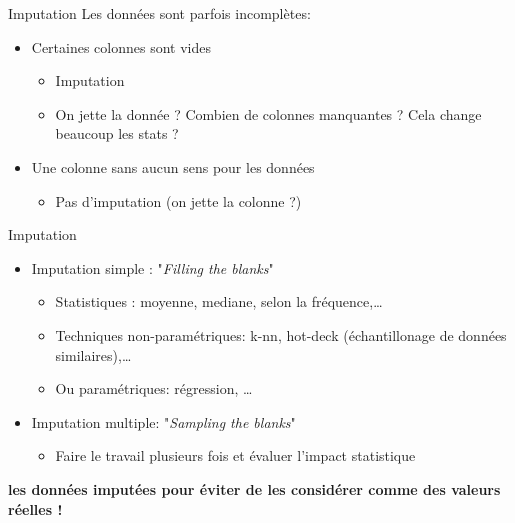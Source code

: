 \documentclass[french]{beamer}
\begin{document}
\begin{frame}{Imputation}
Les données sont parfois incomplètes:
\begin{itemize}
	\item Certaines colonnes sont vides 
	\begin{itemize}
		\item Imputation
		\item On jette la donnée ? Combien de colonnes manquantes ? Cela change beaucoup les stats ?
	\end{itemize}
	
	\item Une colonne sans aucun sens pour les données
	\begin{itemize}
		\item Pas d'imputation (on jette la colonne ?)
	\end{itemize}		
\end{itemize}
\end{frame}

\begin{frame}{Imputation}
\begin{itemize}
	\item Imputation simple : "\textit{Filling the blanks}"
	\begin{itemize}
		\item Statistiques : moyenne, mediane, selon la fréquence,\ldots
		\item Techniques non-paramétriques: k-nn, hot-deck (échantillonage de données similaires),\ldots
		\item Ou paramétriques: régression, \ldots
	\end{itemize}
	\item Imputation multiple: "\textit{Sampling the blanks}"
	\begin{itemize}
		\item Faire le travail plusieurs fois et évaluer l'impact statistique
	\end{itemize}		
\end{itemize}

\begin{center}
	\begin{Large}
		\textbf{\color{red}{FLAG}}
	\end{Large} \large\textbf{les données imputées pour éviter de les considérer comme des valeurs réelles !}
\end{center}
\end{frame}
\end{document}
